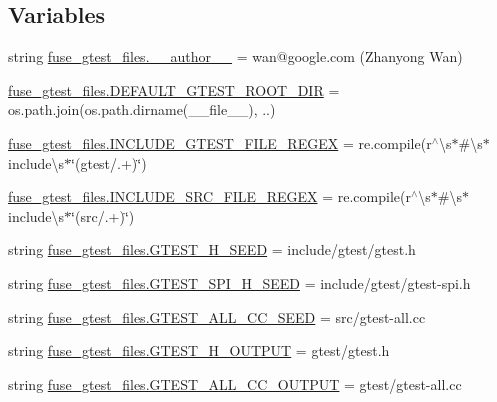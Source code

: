\subsection*{Variables}
\begin{DoxyCompactItemize}
\item 
string \mbox{\hyperlink{namespacefuse__gtest__files_a33bf00338164b922cf67f159e3cded19}{fuse\+\_\+gtest\+\_\+files.\+\_\+\+\_\+author\+\_\+\+\_\+}} = \textquotesingle{}wan@google.\+com (Zhanyong Wan)\textquotesingle{}
\item 
\mbox{\hyperlink{namespacefuse__gtest__files_a68085bdb2912baa7e71d2b3eb37b05c9}{fuse\+\_\+gtest\+\_\+files.\+D\+E\+F\+A\+U\+L\+T\+\_\+\+G\+T\+E\+S\+T\+\_\+\+R\+O\+O\+T\+\_\+\+D\+IR}} = os.\+path.\+join(os.\+path.\+dirname(\+\_\+\+\_\+file\+\_\+\+\_\+), \textquotesingle{}..\textquotesingle{})
\item 
\mbox{\hyperlink{namespacefuse__gtest__files_ad7abe9bfa06bb1c5411e8b4a7a686e5b}{fuse\+\_\+gtest\+\_\+files.\+I\+N\+C\+L\+U\+D\+E\+\_\+\+G\+T\+E\+S\+T\+\_\+\+F\+I\+L\+E\+\_\+\+R\+E\+G\+EX}} = re.\+compile(r\textquotesingle{}$^\wedge$\textbackslash{}s$\ast$\#\textbackslash{}s$\ast$include\textbackslash{}s$\ast$\char`\"{}(gtest/.+)\char`\"{}\textquotesingle{})
\item 
\mbox{\hyperlink{namespacefuse__gtest__files_aec4e054d0ab27276d6150468bb98a8a4}{fuse\+\_\+gtest\+\_\+files.\+I\+N\+C\+L\+U\+D\+E\+\_\+\+S\+R\+C\+\_\+\+F\+I\+L\+E\+\_\+\+R\+E\+G\+EX}} = re.\+compile(r\textquotesingle{}$^\wedge$\textbackslash{}s$\ast$\#\textbackslash{}s$\ast$include\textbackslash{}s$\ast$\char`\"{}(src/.+)\char`\"{}\textquotesingle{})
\item 
string \mbox{\hyperlink{namespacefuse__gtest__files_ad897bce28100f2b97216929013519181}{fuse\+\_\+gtest\+\_\+files.\+G\+T\+E\+S\+T\+\_\+\+H\+\_\+\+S\+E\+ED}} = \textquotesingle{}include/gtest/gtest.\+h\textquotesingle{}
\item 
string \mbox{\hyperlink{namespacefuse__gtest__files_a891d03ce9cfe3577cb4c193f9544f17f}{fuse\+\_\+gtest\+\_\+files.\+G\+T\+E\+S\+T\+\_\+\+S\+P\+I\+\_\+\+H\+\_\+\+S\+E\+ED}} = \textquotesingle{}include/gtest/gtest-\/spi.\+h\textquotesingle{}
\item 
string \mbox{\hyperlink{namespacefuse__gtest__files_a162a6031d0d5743a37a4f79227d5e916}{fuse\+\_\+gtest\+\_\+files.\+G\+T\+E\+S\+T\+\_\+\+A\+L\+L\+\_\+\+C\+C\+\_\+\+S\+E\+ED}} = \textquotesingle{}src/gtest-\/all.\+cc\textquotesingle{}
\item 
string \mbox{\hyperlink{namespacefuse__gtest__files_a16437f87d0f7a9800885a9082a0b773e}{fuse\+\_\+gtest\+\_\+files.\+G\+T\+E\+S\+T\+\_\+\+H\+\_\+\+O\+U\+T\+P\+UT}} = \textquotesingle{}gtest/gtest.\+h\textquotesingle{}
\item 
string \mbox{\hyperlink{namespacefuse__gtest__files_aa66c14474599109c46ec24eaa0ad4217}{fuse\+\_\+gtest\+\_\+files.\+G\+T\+E\+S\+T\+\_\+\+A\+L\+L\+\_\+\+C\+C\+\_\+\+O\+U\+T\+P\+UT}} = \textquotesingle{}gtest/gtest-\/all.\+cc\textquotesingle{}
\end{DoxyCompactItemize}
